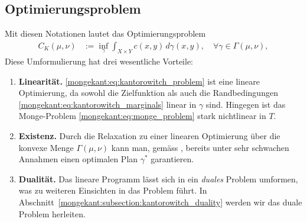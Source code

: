 \subsection{Optimierungsproblem}
Mit diesen Notationen lautet das Optimierungsproblem
\begin{align}
C_K(\mu, \nu)
&:=
\inf_{\gamma}
\int_{X \times Y} c(x,y)\, d\gamma(x,y)
,\quad
\forall \gamma \in \Gamma(\mu, \nu)
,
\label{mongekant:eq:kantorowitch_problem}
\end{align}
Diese Umformulierung hat drei wesentliche Vorteile:
\begin{enumerate}
\item \textbf{Linearität.}
\eqref{mongekant:eq:kantorowitch_problem}
ist eine lineare Optimierung,
da sowohl die Zielfunktion
als auch die Randbedingungen \eqref{mongekant:eq:kantorowitch_marginals}
linear in $\gamma$ sind.
Hingegen ist das Monge-Problem \eqref{mongekant:eq:monge_problem}
stark nichtlinear in $T$.
\item \textbf{Existenz.}
Durch die Relaxation zu einer linearen Optimierung
über die konvexe Menge $\Gamma(\mu,\nu)$ kann man,
gemäss \cite{mongekant:ethlecture},
bereits unter sehr schwachen Annahmen
einen optimalen Plan $\gamma^{\ast}$ garantieren.
\item \textbf{Dualität.}
Das lineare Programm lässt sich in ein \emph{duales} Problem umformen,
was zu weiteren Einsichten in das Problem führt.
In Abschnitt~\ref{mongekant:subsection:kantorowitch_duality} werden
wir das duale Problem herleiten.
\end{enumerate}

